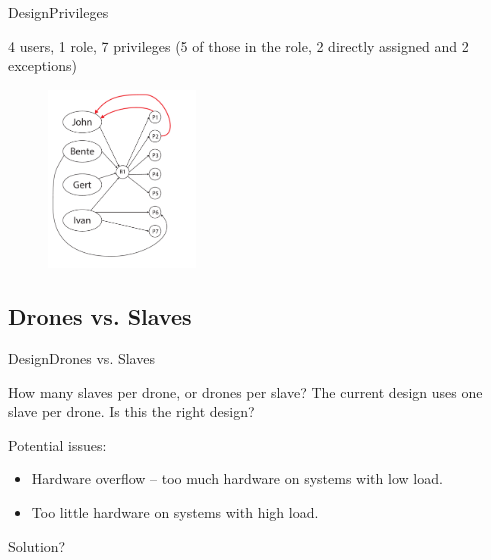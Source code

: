 \begin{frame}{Design}{Privileges}
  \begin{block}{}
  	4 users, 1 role, 7 privileges (5 of those in the role, 2 directly assigned and 2 exceptions)

  	\begin{figure}[htb]
    	\centering
    	\includegraphics[width=0.35\textwidth]{images/privileges5.pdf}
  	\end{figure}
  \end{block}
\end{frame}



\subsection{Drones vs. Slaves}
\begin{frame}{Design}{Drones vs. Slaves}
  \begin{block}{How many slaves per drone, or drones per slave?}
	The current design uses one slave per drone. Is this the right design?

	Potential issues:
	\begin{itemize}
		\item Hardware overflow -- too much hardware on systems with low load.
		\item Too little hardware on systems with high load.
	\end{itemize}

	Solution?
  \end{block}
\end{frame}



